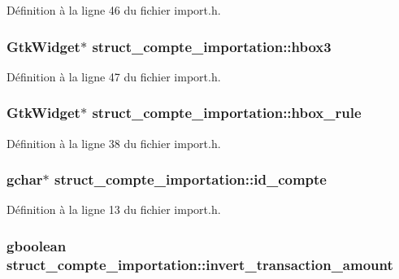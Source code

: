 Définition à la ligne 46 du fichier import.h.

\subsubsection[{hbox3}]{\setlength{\rightskip}{0pt plus 5cm}GtkWidget$\ast$ {\bf struct\_\-compte\_\-importation::hbox3}}\label{structstruct__compte__importation_a8262f71d590e76596af72da501edd71f}


Définition à la ligne 47 du fichier import.h.

\subsubsection[{hbox\_\-rule}]{\setlength{\rightskip}{0pt plus 5cm}GtkWidget$\ast$ {\bf struct\_\-compte\_\-importation::hbox\_\-rule}}\label{structstruct__compte__importation_abc9c9bafb88d9ad438ec22e9bb90c2b9}


Définition à la ligne 38 du fichier import.h.

\subsubsection[{id\_\-compte}]{\setlength{\rightskip}{0pt plus 5cm}gchar$\ast$ {\bf struct\_\-compte\_\-importation::id\_\-compte}}\label{structstruct__compte__importation_a98f4d0a1bbbb5dd69fb25e6a4fdb477b}


Définition à la ligne 13 du fichier import.h.

\subsubsection[{invert\_\-transaction\_\-amount}]{\setlength{\rightskip}{0pt plus 5cm}gboolean {\bf struct\_\-compte\_\-importation::invert\_\-transaction\_\-amount}}\label{structstruct__compte__importation_a0f636d05dd8412ef76fe29b93349dcce}


